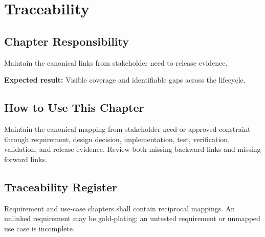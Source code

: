 \chapter{Traceability}
\section{Chapter Responsibility}
\label{Section:TraceabilityResponsibility}
Maintain the canonical links from stakeholder need to release evidence.

\noindent\textbf{Expected result:} Visible coverage and identifiable gaps across the lifecycle.

\section{How to Use This Chapter}
Maintain the canonical mapping from stakeholder need or approved constraint through requirement, design decision, implementation, test, verification, validation, and release evidence. Review both missing backward links and missing forward links.
\section{Traceability Register}
Requirement and use-case chapters shall contain reciprocal mappings. An
unlinked requirement may be gold-plating; an untested requirement or unmapped
use case is incomplete.

